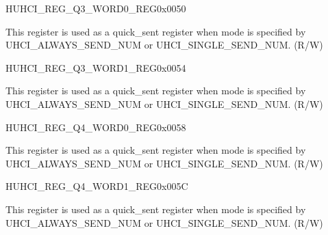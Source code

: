 \begin{register}{H}{UHCI\_REG\_Q3\_WORD0\_REG}{0x{}0050}\label{regdesc:UHCIREGQ3WORD0REG}
%
\regnewline%
\begin{regdesc}\begin{reglist}
\label{fielddesc:UHCISENDQ3WORD0}\item [UHCI\_SEND\_Q3\_WORD0] This register is used as a quick\_sent register when mode is specified by UHCI\_ALWAYS\_SEND\_NUM or UHCI\_SINGLE\_SEND\_NUM. (R/W)
\end{reglist}\end{regdesc}
\end{register}


\begin{register}{H}{UHCI\_REG\_Q3\_WORD1\_REG}{0x{}0054}\label{regdesc:UHCIREGQ3WORD1REG}
%
\regnewline%
\begin{regdesc}\begin{reglist}
\label{fielddesc:UHCISENDQ3WORD1}\item [UHCI\_SEND\_Q3\_WORD1] This register is used as a quick\_sent register when mode is specified by UHCI\_ALWAYS\_SEND\_NUM or UHCI\_SINGLE\_SEND\_NUM. (R/W)
\end{reglist}\end{regdesc}
\end{register}


\begin{register}{H}{UHCI\_REG\_Q4\_WORD0\_REG}{0x{}0058}\label{regdesc:UHCIREGQ4WORD0REG}
%
\regnewline%
\begin{regdesc}\begin{reglist}
\label{fielddesc:UHCISENDQ4WORD0}\item [UHCI\_SEND\_Q4\_WORD0] This register is used as a quick\_sent register when mode is specified by UHCI\_ALWAYS\_SEND\_NUM or UHCI\_SINGLE\_SEND\_NUM. (R/W)
\end{reglist}\end{regdesc}
\end{register}


\begin{register}{H}{UHCI\_REG\_Q4\_WORD1\_REG}{0x{}005C}\label{regdesc:UHCIREGQ4WORD1REG}
%
\regnewline%
\begin{regdesc}\begin{reglist}
\label{fielddesc:UHCISENDQ4WORD1}\item [UHCI\_SEND\_Q4\_WORD1] This register is used as a quick\_sent register when mode is specified by UHCI\_ALWAYS\_SEND\_NUM or UHCI\_SINGLE\_SEND\_NUM. (R/W)
\end{reglist}\end{regdesc}
\end{register}



